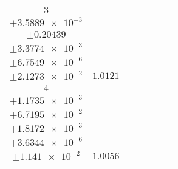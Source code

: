 \documentclass[8pt]{article}
\begin{document}
\begin{longtable}[l]{c c c c c c c}
$\num{3}$ & \begin{tabular}[c]{@{}c@{}}$\num{1.008}$ \\ $\pm\num{3.5889e-3}$\end{tabular} & \begin{tabular}[c]{@{}c@{}}$\num{-5.7939e-2}$ \\ $\pm\num{0.20439}$\end{tabular} & \begin{tabular}[c]{@{}c@{}}$\num{1.9612e+3}$ \\ $\pm\num{3.3774e-3}$\end{tabular} & \begin{tabular}[c]{@{}c@{}}$\num{3.9224}$ \\ $\pm\num{6.7549e-6}$\end{tabular} & \begin{tabular}[c]{@{}c@{}}$\num{7.0448}$ \\ $\pm\num{2.1273e-2}$\end{tabular} & $\num{1.0121}$\\
$\num{4}$ & \begin{tabular}[c]{@{}c@{}}$\num{1.0009}$ \\ $\pm\num{1.1735e-3}$\end{tabular} & \begin{tabular}[c]{@{}c@{}}$\num{-4.0908e-2}$ \\ $\pm\num{6.7195e-2}$\end{tabular} & \begin{tabular}[c]{@{}c@{}}$\num{1.9814e+3}$ \\ $\pm\num{1.8172e-3}$\end{tabular} & \begin{tabular}[c]{@{}c@{}}$\num{3.9628}$ \\ $\pm\num{3.6344e-6}$\end{tabular} & \begin{tabular}[c]{@{}c@{}}$\num{7.0131}$ \\ $\pm\num{1.141e-2}$\end{tabular} & $\num{1.0056}$\\
\bottomrule
\end{longtable}
\end{document}
